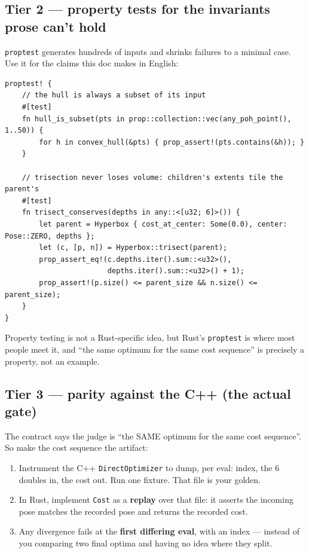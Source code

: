 \documentclass[11pt]{article}
\begin{document}
\subsection{Tier 2 — property tests for the invariants prose can't hold}
\label{sec:org0ad58c2}

\texttt{proptest} generates hundreds of inputs and shrinks failures to a minimal case.
Use it for the claims this doc makes in English:

\begin{verbatim}
proptest! {
    // the hull is always a subset of its input
    #[test]
    fn hull_is_subset(pts in prop::collection::vec(any_poh_point(), 1..50)) {
        for h in convex_hull(&pts) { prop_assert!(pts.contains(&h)); }
    }

    // trisection never loses volume: children's extents tile the parent's
    #[test]
    fn trisect_conserves(depths in any::<[u32; 6]>()) {
        let parent = Hyperbox { cost_at_center: Some(0.0), center: Pose::ZERO, depths };
        let (c, [p, n]) = Hyperbox::trisect(parent);
        prop_assert_eq!(c.depths.iter().sum::<u32>(),
                        depths.iter().sum::<u32>() + 1);
        prop_assert!(p.size() <= parent_size && n.size() <= parent_size);
    }
}
\end{verbatim}

Property testing is not a Rust-specific idea, but Rust's \texttt{proptest} is where
most people meet it, and ``the same optimum for the same cost sequence'' is
precisely a property, not an example.
\subsection{Tier 3 — parity against the C++ (the actual gate)}
\label{sec:org0f5e47e}

The contract says the judge is ``the SAME optimum for the same cost sequence''.
So make the cost sequence the artifact:

\begin{enumerate}
\item Instrument the C++ \texttt{DirectOptimizer} to dump, per eval: index, the 6 doubles
in, the cost out. Run one fixture. That file is your golden.
\item In Rust, implement \texttt{Cost} as a \textbf{replay} over that file: it asserts the
incoming pose matches the recorded pose and returns the recorded cost.
\item Any divergence fails at the \textbf{first differing eval}, with an index — instead
of you comparing two final optima and having no idea where they split.
\end{enumerate}
\end{document}
